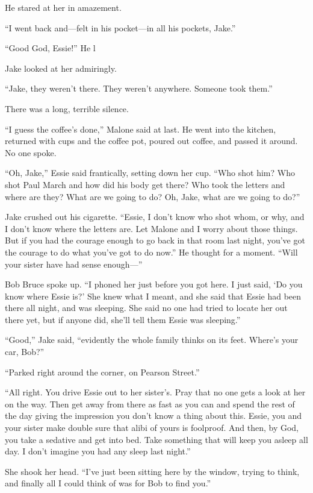 \documentclass{novel}
\begin{document}
He stared at her in amazement.

“I went back and—felt in his pocket—in all his pockets, Jake.”

“Good God, Essie!” He l

Jake looked at her admiringly.

“Jake, they weren’t there. They weren’t anywhere. Someone took them.”

There was a long, terrible silence.

“I guess the coffee’s done,” Malone said at last. He went into the kitchen, returned with cups and the coffee pot, poured out coffee, and passed it around. No one spoke.

“Oh, Jake,” Essie said frantically, setting down her cup. “Who shot him? Who shot Paul March and how did his body get there? Who took the letters and where are they? What are we going to do? Oh, Jake, what are we going to do?”

Jake crushed out his cigarette. “Essie, I don’t know who shot whom, or why, and I don’t know where the letters are. Let Malone and I worry about those things. But if you had the courage enough to go back in that room last night, you’ve got the courage to do what you’ve got to do now.” He thought for a moment. “Will your sister have had sense enough—”

Bob Bruce spoke up. “I phoned her just before you got here. I just said, ‘Do you know where Essie is?’ She knew what I meant, and she said that Essie had been there all night, and was sleeping. She said no one had tried to locate her out there yet, but if anyone did, she’ll tell them Essie was sleeping.”

“Good,” Jake said, “evidently the whole family thinks on its feet. Where’s your car, Bob?”

“Parked right around the corner, on Pearson Street.”

“All right. You drive Essie out to her sister’s. Pray that no one gets a look at her on the way. Then get away from there as fast as you can and spend the rest of the day giving the impression you don’t know a thing about this. Essie, you and your sister make double sure that alibi of yours is foolproof. And then, by God, you take a sedative and get into bed. Take something that will keep you asleep all day. I don’t imagine you had any sleep last night.”

She shook her head. “I’ve just been sitting here by the window, trying to think, and finally all I could think of was for Bob to find you.”
\end{document}

